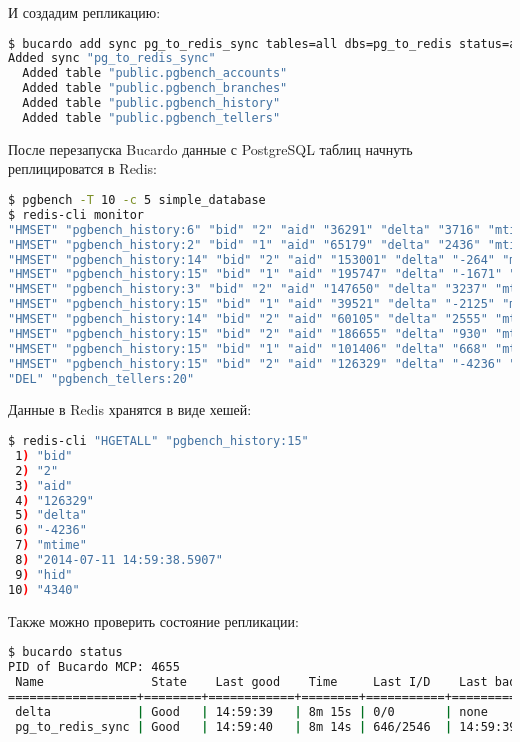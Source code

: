 И создадим репликацию:

\begin{lstlisting}[language=Bash,label=lst:bucardo-redis4,caption=Установка sync]
$ bucardo add sync pg_to_redis_sync tables=all dbs=pg_to_redis status=active
Added sync "pg_to_redis_sync"
  Added table "public.pgbench_accounts"
  Added table "public.pgbench_branches"
  Added table "public.pgbench_history"
  Added table "public.pgbench_tellers"
\end{lstlisting}

После перезапуска Bucardo данные с PostgreSQL таблиц начнуть реплицироватся в Redis:

\begin{lstlisting}[language=Bash,label=lst:bucardo-redis5,caption=Репликация в redis]
$ pgbench -T 10 -c 5 simple_database
$ redis-cli monitor
"HMSET" "pgbench_history:6" "bid" "2" "aid" "36291" "delta" "3716" "mtime" "2014-07-11 14:59:38.454824" "hid" "4331"
"HMSET" "pgbench_history:2" "bid" "1" "aid" "65179" "delta" "2436" "mtime" "2014-07-11 14:59:38.500896" "hid" "4332"
"HMSET" "pgbench_history:14" "bid" "2" "aid" "153001" "delta" "-264" "mtime" "2014-07-11 14:59:38.472706" "hid" "4333"
"HMSET" "pgbench_history:15" "bid" "1" "aid" "195747" "delta" "-1671" "mtime" "2014-07-11 14:59:38.509839" "hid" "4334"
"HMSET" "pgbench_history:3" "bid" "2" "aid" "147650" "delta" "3237" "mtime" "2014-07-11 14:59:38.489878" "hid" "4335"
"HMSET" "pgbench_history:15" "bid" "1" "aid" "39521" "delta" "-2125" "mtime" "2014-07-11 14:59:38.526317" "hid" "4336"
"HMSET" "pgbench_history:14" "bid" "2" "aid" "60105" "delta" "2555" "mtime" "2014-07-11 14:59:38.616935" "hid" "4337"
"HMSET" "pgbench_history:15" "bid" "2" "aid" "186655" "delta" "930" "mtime" "2014-07-11 14:59:38.541296" "hid" "4338"
"HMSET" "pgbench_history:15" "bid" "1" "aid" "101406" "delta" "668" "mtime" "2014-07-11 14:59:38.560971" "hid" "4339"
"HMSET" "pgbench_history:15" "bid" "2" "aid" "126329" "delta" "-4236" "mtime" "2014-07-11 14:59:38.5907" "hid" "4340"
"DEL" "pgbench_tellers:20"
\end{lstlisting}

Данные в Redis хранятся в виде хешей:

\begin{lstlisting}[language=Bash,label=lst:bucardo-redis6,caption=Данные в redis]
$ redis-cli "HGETALL" "pgbench_history:15"
 1) "bid"
 2) "2"
 3) "aid"
 4) "126329"
 5) "delta"
 6) "-4236"
 7) "mtime"
 8) "2014-07-11 14:59:38.5907"
 9) "hid"
10) "4340"
\end{lstlisting}

Также можно проверить состояние репликации:

\begin{lstlisting}[language=Bash,label=lst:bucardo-redis6,caption=Установка redis]
$ bucardo status
PID of Bucardo MCP: 4655
 Name               State    Last good    Time     Last I/D    Last bad    Time
==================+========+============+========+===========+===========+========
 delta            | Good   | 14:59:39   | 8m 15s | 0/0       | none      |
 pg_to_redis_sync | Good   | 14:59:40   | 8m 14s | 646/2546  | 14:59:39  | 8m 15s
\end{lstlisting}

